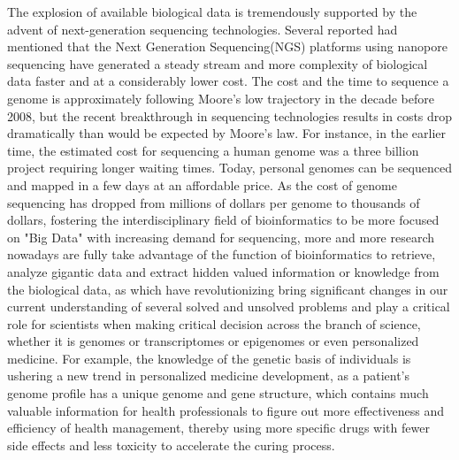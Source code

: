 \documentclass[12pt]{article}
\begin{document}
The explosion of available biological data is tremendously supported by the advent of next-generation sequencing technologies. Several reported had mentioned that the Next Generation Sequencing(NGS) platforms using nanopore sequencing have generated a steady stream and more complexity of biological data faster and at a considerably lower cost. The cost and the time to sequence a genome is approximately following Moore's low trajectory in the decade before 2008, but the recent breakthrough in sequencing technologies results in costs drop dramatically than would be expected by Moore’s law. For instance, in the earlier time, the estimated cost for sequencing a human genome was a three billion project requiring longer waiting times. Today, personal genomes can be sequenced and mapped in a few days at an affordable price. As the cost of genome sequencing has dropped from millions of dollars per genome to thousands of dollars, fostering the interdisciplinary field of bioinformatics to be more focused on "Big Data" with increasing demand for sequencing, more and more research nowadays are fully take advantage of the function of bioinformatics to retrieve, analyze gigantic data and extract hidden valued information or knowledge from the biological data, as which have revolutionizing bring significant changes in our current understanding of several solved and unsolved problems and play a critical role for scientists when making critical decision across the branch of science, whether it is genomes or transcriptomes or epigenomes or even personalized medicine. For example, the knowledge of the genetic basis of individuals is ushering a new trend in personalized medicine development, as a patient's genome profile has a  unique genome and gene structure, which contains much valuable information for health professionals to figure out more effectiveness and efficiency of health management, thereby using more specific drugs with fewer side effects and less toxicity to accelerate the curing process.\medskip
\end{document}
